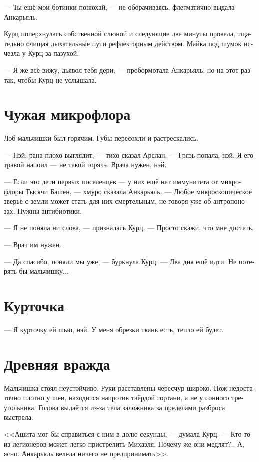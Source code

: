 \documentclass[a4paper,10pt,fleqn]{book}\usepackage{polyglossia}\setdefaultlanguage[babelshorthands=true]{russian}\setotherlanguage{english}\defaultfontfeatures{Ligatures=TeX,Mapping=tex-text}\usepackage{xcolor}\newcommand{\ml}[3]{#2}
\begin{document}
--- Ты ещё мои ботинки понюхай, --- не оборачиваясь, флегматично выдала Анкарьяль.

Курц поперхнулась собственной слюной и следующие две минуты провела, тщательно очищая дыхательные пути рефлекторным действом.
Майка под шумок исчезла у Курц за пазухой.

--- Я же всё вижу, дьявол тебя дери, --- пробормотала Анкарьяль, но на этот раз так, чтобы Курц не услышала.

\section{Чужая микрофлора}

Лоб мальчишки был горячим.
Губы пересохли и растрескались.

--- Нэй, рана плохо выглядит, --- тихо сказал Арслан.
--- Грязь попала, нэй.
Я его травой напоил --- не такой горячэ.
Врача нужен, нэй.

--- Если это дети первых поселенцев --- у них ещё нет иммунитета от микрофлоры Тысячи Башен, --- хмуро сказала Анкарьяль.
--- Любое микроскопическое зверьё с земли может стать для них смертельным, не говоря уже об антропонозах.
Нужны антибиотики.

--- Я не поняла ни слова, --- призналась Курц.
--- Просто скажи, что мне достать.

--- Врач им нужен.

--- Да спасибо, поняли мы уже, --- буркнула Курц.
--- Два дня ещё идти.
Не потерять бы мальчишку...

\section{Курточка}

--- Я курточку ей шью, нэй.
У меня обрезки ткань есть, тепло ей будет.

\section{Древняя вражда}

Мальчишка стоял неустойчиво.
Руки расставлены чересчур широко.
Нож недостаточно плотно у шеи, находится напротив твёрдой гортани, а не у сонного треугольника.
Голова выдаётся из-за тела заложника за пределами разброса выстрела.

\ml{$0$}
{<<Ашита мог бы справиться с ним в долю секунды, --- думала Курц.}
{\textit{Ashita could handle him in a split second,} Kurz thought.}
\ml{$0$}
{--- Кто-то из легионеров может легко пристрелить Михаэля.}
{\textit{One of the legionaires could easily shoot Michael.}}
\ml{$0$}
{Почему же они медлят?..}
{\textit{Why do they hesitate ...?}}
\ml{$0$}
{А, ясно.}
{\textit{Ah, I see.}}
\ml{$0$}
{Анкарьяль велела ничего не предпринимать>>.}
{\textit{Angaralle told no moves.}}
\end{document}
